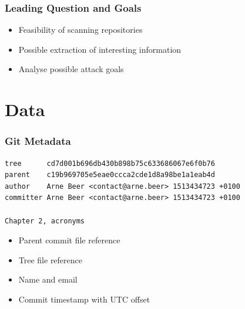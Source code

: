 \documentclass[t]{beamer}
\begin{document}
\begin{frame}
    \frametitle{Leading Question and Goals}
    \vspace{1cm}
    \begin{itemize}
        \item Feasibility of scanning repositories
        \item Possible extraction of interesting information
        \item Analyse possible attack goals
    \end{itemize}
\end{frame}

\section{Data}

\begin{frame}[fragile]
    \frametitle{Git Metadata}
    \begin{verbatim}
tree      cd7d001b696db430b898b75c633686067e6f0b76
parent    c19b969705e5eae0ccca2cde1d8a98be1a1eab4d
author    Arne Beer <contact@arne.beer> 1513434723 +0100
committer Arne Beer <contact@arne.beer> 1513434723 +0100

Chapter 2, acronyms
    \end{verbatim}

    \begin{itemize}
        \item Parent commit file reference
        \item Tree file reference
        \item Name and email
        \item Commit timestamp with UTC offset
    \end{itemize}
\end{frame}
\end{document}
